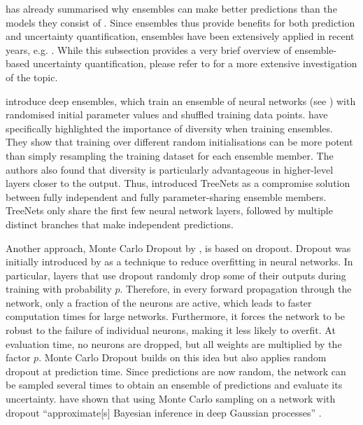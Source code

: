 \newpar {} has already summarised why ensembles can make better predictions than the models they consist of \cite{ml-ensembles-2000}. Since ensembles thus provide benefits for both prediction and uncertainty quantification, ensembles have been extensively applied in recent years, e.g. \cite{mc-dropout-2016, deep-ensembles-2017, ensemble-uncertainty-2021, ensemble-diversity-2015, ensemble-uncertainty-ood-2021}. While this subsection provides a very brief overview of ensemble-based uncertainty quantification, please refer to \textcite{ensemble-uncertainty-2021} for a more extensive investigation of the topic.

\textcite{deep-ensembles-2017} introduce deep ensembles, which train an ensemble of neural networks (see ) with randomised initial parameter values and shuffled training data points. \textcite{ensemble-diversity-2015} have specifically highlighted the importance of diversity when training ensembles. They show that training over different random initialisations can be more potent than simply resampling the training dataset for each ensemble member. The authors also found that diversity is particularly advantageous in higher-level layers closer to the output. Thus, \citeauthor{ensemble-diversity-2015} introduced TreeNets as a compromise solution between fully independent and fully parameter-sharing ensemble members. TreeNets only share the first few neural network layers, followed by multiple distinct branches that make independent predictions.

Another approach, Monte Carlo Dropout by \textcite{mc-dropout-2016}, is based on dropout. Dropout was initially introduced by \textcite{dropout-2014} as a technique to reduce overfitting in neural networks. In particular, layers that use dropout randomly drop some of their outputs during training with probability $p$. Therefore, in every forward propagation through the network, only a fraction of the neurons are active, which leads to faster computation times for large networks. Furthermore, it forces the network to be robust to the failure of individual neurons, making it less likely to overfit. At evaluation time, no neurons are dropped, but all weights are multiplied by the factor $p$. Monte Carlo Dropout builds on this idea but also applies random dropout at prediction time. Since predictions are now random, the network can be sampled several times to obtain an ensemble of predictions and evaluate its uncertainty. \citeauthor{mc-dropout-2016} have shown that using Monte Carlo sampling on a network with dropout ``approximate[s] Bayesian inference in deep Gaussian processes'' \cite{mc-dropout-2016}.

